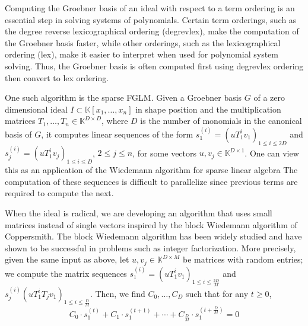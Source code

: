 \documentclass[12pt]{article}
\begin{document}
Computing the Groebner basis of an ideal with respect to a term ordering is an essential step in solving systems of polynomials.
Certain term orderings, such as the degree reverse lexicographical ordering (degrevlex), make the computation of the Groebner basis
faster, while other orderings, such as the lexicographical ordering (lex), make it easier to interpret when
used for polynomial system solving. Thus, the Groebner basis is often computed first using degrevlex ordering then convert to
lex ordering.

One such algorithm is the sparse FGLM. Given a Groebner basis $G$ of a zero dimensional ideal $I \subset \mathbb{K}[x_1, \dots, x_n]$ 
in shape position and the multiplication matrices $T_1,\dots, T_n \in \mathbb{K}^{D \times D}$, where $D$ is the number of 
monomials in the canonical basis of $G$, it computes linear sequences of the form $s_1^{(i)} = (uT_1^iv_1)_{1\le i \le 2D}$ and
$s_j^{(i)} = (uT_1^iv_j)_{1\le i \le D}$, $2 \le j \le n$, for some vectors $u,v_j \in 
\mathbb{K}^{D\times 1}$. One can view this as an application of the Wiedemann algorithm for sparse linear algebra The computation of these sequences is difficult to parallelize since previous terms are required
to compute the next. 

When the ideal is radical, we are developing an algorithm that uses small matrices instead of single vectors inspired by the block Wiedemann
algorithm of Coppersmith. The block Wiedemann algorithm has been widely studied and have shown to be successful in problems such
as integer factorization.
More precisely, given the same input as above, let $u,v_j \in \mathbb{K}^{D \times M}$ be matrices with random entries; we compute the matrix sequences $s_1^{(i)} = (uT_1^iv_1)_{1\le i \le \frac{2D}{M}}$ and $s_j^{(i)} (uT_1^i T_j v_1)_{1\le i \le \frac{D}{M}}$. Then, we find $C_0, \dots, C_D$ such that for any $t \ge 0$,
$$ C_0 \cdot s_1^{(t)} + C_1 \cdot s_1^{(t+1)} + \cdots + C_{\frac{D}{M}} \cdot s_1^{(t+\frac{D}{M})}  = 0$$

 
\end{document}
